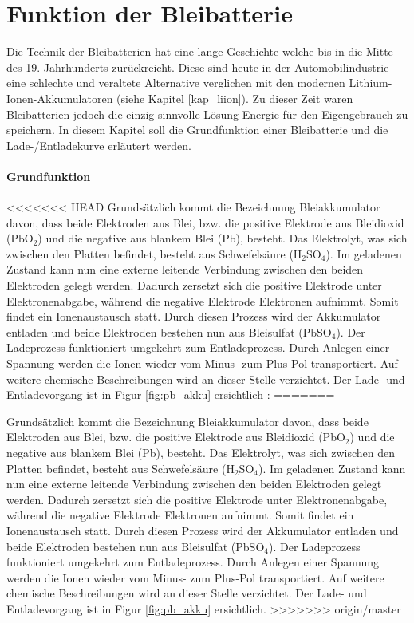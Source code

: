 \section{Funktion der Bleibatterie}

Die Technik der Bleibatterien hat eine lange Geschichte welche bis in die Mitte des 19. Jahrhunderts zurückreicht. Diese sind heute in der Automobilindustrie eine schlechte und veraltete Alternative verglichen mit den modernen Lithium-Ionen-Akkumulatoren (siehe Kapitel \ref{kap_liion}). Zu dieser Zeit waren Bleibatterien jedoch die einzig sinnvolle Lösung Energie für den Eigengebrauch zu speichern. In diesem Kapitel soll die Grundfunktion einer Bleibatterie und die Lade-/Entladekurve erläutert werden.

\paragraph{Grundfunktion}
<<<<<<< HEAD
Grundsätzlich kommt die Bezeichnung Bleiakkumulator davon, dass beide Elektroden aus Blei, bzw. die positive Elektrode aus Bleidioxid (PbO$_2$) und die negative aus blankem Blei (Pb), besteht. Das Elektrolyt, was sich zwischen den Platten befindet, besteht aus Schwefelsäure (H$_2$SO$_4$). Im geladenen Zustand kann nun eine externe leitende Verbindung zwischen den beiden Elektroden gelegt werden. Dadurch zersetzt sich die positive Elektrode unter Elektronenabgabe, während die negative Elektrode Elektronen aufnimmt. Somit findet ein Ionenaustausch statt. Durch diesen Prozess wird der Akkumulator entladen und beide Elektroden bestehen nun aus Bleisulfat (PbSO$_4$). Der Ladeprozess funktioniert umgekehrt zum Entladeprozess. Durch Anlegen einer Spannung werden die Ionen wieder vom Minus- zum Plus-Pol transportiert. Auf weitere chemische Beschreibungen wird an dieser Stelle verzichtet. Der Lade- und Entladevorgang ist in Figur \ref{fig:pb_akku} ersichtlich \cite{pb_akku_funktion}:
=======

Grundsätzlich kommt die Bezeichnung Bleiakkumulator davon, dass beide Elektroden aus Blei, bzw. die positive Elektrode aus Bleidioxid (PbO$_2$) und die negative aus blankem Blei (Pb), besteht. Das Elektrolyt, was sich zwischen den Platten befindet, besteht aus Schwefelsäure (H$_2$SO$_4$). Im geladenen Zustand kann nun eine externe leitende Verbindung zwischen den beiden Elektroden gelegt werden. Dadurch zersetzt sich die positive Elektrode unter Elektronenabgabe, während die negative Elektrode Elektronen aufnimmt. Somit findet ein Ionenaustausch statt. Durch diesen Prozess wird der Akkumulator entladen und beide Elektroden bestehen nun aus Bleisulfat (PbSO$_4$). Der Ladeprozess funktioniert umgekehrt zum Entladeprozess. Durch Anlegen einer Spannung werden die Ionen wieder vom Minus- zum Plus-Pol transportiert. Auf weitere chemische Beschreibungen wird an dieser Stelle verzichtet. Der Lade- und Entladevorgang ist in Figur \ref{fig:pb_akku} ersichtlich.  \cite{pb_akku_funktion}
>>>>>>> origin/master

